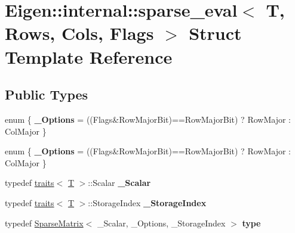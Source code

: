 \hypertarget{struct_eigen_1_1internal_1_1sparse__eval}{}\section{Eigen\+:\+:internal\+:\+:sparse\+\_\+eval$<$ T, Rows, Cols, Flags $>$ Struct Template Reference}
\label{struct_eigen_1_1internal_1_1sparse__eval}
\subsection*{Public Types}
\begin{DoxyCompactItemize}
\item 
\mbox{\label{struct_eigen_1_1internal_1_1sparse__eval_a4a37bf826d6b7cf43576ba961ffcd748}} 
enum \{ {\bfseries \+\_\+\+Options} = ((Flags\&Row\+Major\+Bit)==Row\+Major\+Bit) ? Row\+Major \+: Col\+Major
 \}
\item 
\mbox{\label{struct_eigen_1_1internal_1_1sparse__eval_a8b0019977594a8b4f5ee877cf23d670c}} 
enum \{ {\bfseries \+\_\+\+Options} = ((Flags\&Row\+Major\+Bit)==Row\+Major\+Bit) ? Row\+Major \+: Col\+Major
 \}
\item 
\mbox{\label{struct_eigen_1_1internal_1_1sparse__eval_aa7ec65e247c09cc782737dd1b917c746}} 
typedef \hyperlink{struct_eigen_1_1internal_1_1traits}{traits}$<$ \hyperlink{group___sparse_core___module}{T} $>$\+::Scalar {\bfseries \+\_\+\+Scalar}
\item 
\mbox{\label{struct_eigen_1_1internal_1_1sparse__eval_a83ac96d9391f27e971a99878d9480258}} 
typedef \hyperlink{struct_eigen_1_1internal_1_1traits}{traits}$<$ \hyperlink{group___sparse_core___module}{T} $>$\+::Storage\+Index {\bfseries \+\_\+\+Storage\+Index}
\item 
\mbox{\label{struct_eigen_1_1internal_1_1sparse__eval_aff5f6f9f14505af5bbb191f469749a84}} 
typedef \hyperlink{group___sparse_core___module_class_eigen_1_1_sparse_matrix}{Sparse\+Matrix}$<$ \+\_\+\+Scalar, \+\_\+\+Options, \+\_\+\+Storage\+Index $>$ {\bfseries type}

\end{DoxyCompactItemize}
